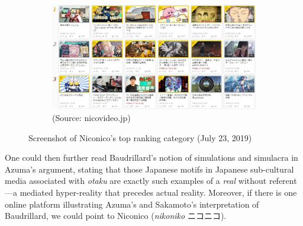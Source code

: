 \documentclass[10pt,british,A4paper,twoside]{memoir}
\begin{document}
\begin{figure}[!htb]
 \centering
 \begin{subfigure}[b]{0.75\textwidth}
 \includegraphics[width=\textwidth]{images/2channel/niconico.jpg}
 \caption*{(Source: nicovideo.jp)}
 \end{subfigure}
 \caption{Screenshot of Niconico's top ranking category (July 23, 2019)}\label{fig:nicotop}
\end{figure}

One could then further read Baudrillard's notion of simulations and
simulacra in Azuma's argument, stating that those Japanese motifs in
Japanese sub-cultural media associated with \emph{otaku} are exactly
such examples of a \emph{real} without referent---a mediated
hyper-reality that precedes actual reality. Moreover, if there is one
online platform illustrating Azuma's and Sakamoto's interpretation of
Baudrillard, we could point to Niconico (\emph{nikoniko} ニコニコ).
\end{document}
